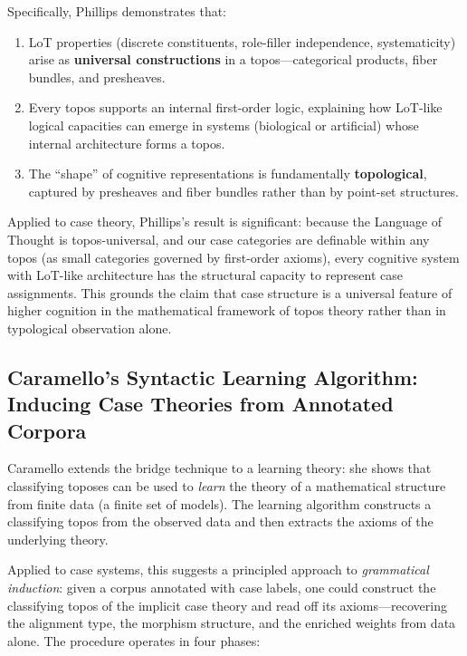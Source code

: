 \documentclass[
]{article}
\begin{document}
Specifically, Phillips demonstrates that:

\begin{enumerate}
\def\labelenumi{\arabic{enumi}.}
\item
  LoT properties (discrete constituents, role-filler independence,
  systematicity) arise as \textbf{universal constructions} in a
  topos---categorical products, fiber bundles, and presheaves.
\item
  Every topos supports an internal first-order logic, explaining how
  LoT-like logical capacities can emerge in systems (biological or
  artificial) whose internal architecture forms a topos.
\item
  The ``shape'' of cognitive representations is fundamentally
  \textbf{topological}, captured by presheaves and fiber bundles rather
  than by point-set structures.
\end{enumerate}

Applied to case theory, Phillips's result is significant: because the
Language of Thought is topos-universal, and our case categories are
definable within any topos (as small categories governed by first-order
axioms), every cognitive system with LoT-like architecture has the
structural capacity to represent case assignments. This grounds the
claim that case structure is a universal feature of higher cognition in
the mathematical framework of topos theory rather than in typological
observation alone.

\subsection{Caramello's Syntactic Learning Algorithm: Inducing Case
Theories from Annotated
Corpora}\label{caramellos-syntactic-learning-algorithm-inducing-case-theories-from-annotated-corpora}

Caramello \citeyearpar{caramello2023syntactic} extends the bridge
technique to a learning theory: she shows that classifying toposes can
be used to \emph{learn} the theory of a mathematical structure from
finite data (a finite set of models). The learning algorithm constructs
a classifying topos from the observed data and then extracts the axioms
of the underlying theory.

Applied to case systems, this suggests a principled approach to
\emph{grammatical induction}: given a corpus annotated with case labels,
one could construct the classifying topos of the implicit case theory
and read off its axioms---recovering the alignment type, the morphism
structure, and the enriched weights from data alone. The procedure
operates in four phases:
\end{document}
